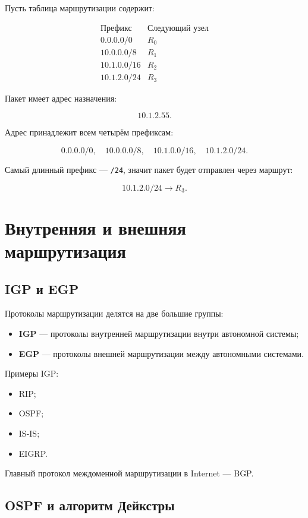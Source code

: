 \documentclass[12pt,a4paper]{article}
\begin{document}
Пусть таблица маршрутизации содержит:

\[
\begin{array}{c|c}
\text{Префикс} & \text{Следующий узел} \\
\hline
0.0.0.0/0 & R_0 \\
10.0.0.0/8 & R_1 \\
10.1.0.0/16 & R_2 \\
10.1.2.0/24 & R_3
\end{array}
\]

Пакет имеет адрес назначения:

\[
10.1.2.55.
\]

Адрес принадлежит всем четырём префиксам:

\[
0.0.0.0/0,\quad 10.0.0.0/8,\quad 10.1.0.0/16,\quad 10.1.2.0/24.
\]

Самый длинный префикс --- \texttt{/24}, значит пакет будет отправлен через маршрут:

\[
10.1.2.0/24 \rightarrow R_3.
\]

\section{Внутренняя и внешняя маршрутизация}

\subsection{IGP и EGP}

Протоколы маршрутизации делятся на две большие группы:

\begin{itemize}
    \item \textbf{IGP} --- протоколы внутренней маршрутизации внутри автономной системы;
    \item \textbf{EGP} --- протоколы внешней маршрутизации между автономными системами.
\end{itemize}

Примеры IGP:

\begin{itemize}
    \item RIP;
    \item OSPF;
    \item IS-IS;
    \item EIGRP.
\end{itemize}

Главный протокол междоменной маршрутизации в Internet --- BGP.

\subsection{OSPF и алгоритм Дейкстры}
\end{document}
